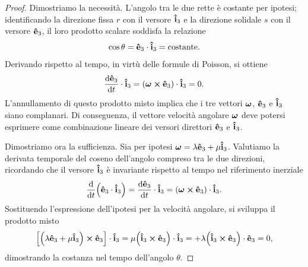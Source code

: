 \begin{proof}
    Dimostriamo la necessità. L'angolo tra le due rette è costante per ipotesi; identificando la direzione fissa $r$ con il versore $\vu{i}_3$ e la direzione solidale $s$ con il versore $\vu{e}_3$, il loro prodotto scalare soddisfa la relazione 
    \begin{equation*}
        \cos\theta = \vu{e}_3 \cdot \vu{i}_3 = \text{costante}.
    \end{equation*} 
    Derivando rispetto al tempo, in virtù delle formule di Poisson, si ottiene
    \begin{equation*}
        \dv{\vu{e}_3}{t} \cdot \vu{i}_3 = (\vb*{\omega} \cross \vu{e}_3) \cdot \vu{i}_3 = 0.
    \end{equation*}
    L'annullamento di questo prodotto misto implica che i tre vettori $\vb*{\omega}$, $\vu{e}_3$ e $\vu{i}_3$ siano complanari. Di conseguenza, il vettore velocità angolare $\vb*{\omega}$ deve potersi esprimere come combinazione lineare dei versori direttori $\vu{e}_3$ e $\vu{i}_3$.

    Dimostriamo ora la sufficienza. Sia per ipotesi $\vb*{\omega} = \lambda \vu{e}_3 + \mu \vu{i}_3$. Valutiamo la derivata temporale del coseno dell'angolo compreso tra le due direzioni, ricordando che il versore $\vu{i}_3$ è invariante rispetto al tempo nel riferimento inerziale
    \begin{equation*}
        \dv{t}\qty(\vu{e}_3 \cdot \vu{i}_3) = \dv{\vu{e}_3}{t} \cdot \vu{i}_3 = (\vb*{\omega} \cross \vu{e}_3) \cdot \vu{i}_3.
    \end{equation*}
    Sostituendo l'espressione dell'ipotesi per la velocità angolare, si sviluppa il prodotto misto
    \begin{equation*}
        \qty[\qty(\lambda \vu{e}_3 + \mu \vu{i}_3) \cross \vu{e}_3] \cdot \vu{i}_3 = \mu \qty(\vu{i}_3 \cross \vu{e}_3) \cdot \vu{i}_3 = + \lambda\qty(\vu{i}_3 \cross \vu{e}_3) \cdot \vu{e}_3 = 0,
    \end{equation*}
    dimostrando la costanza nel tempo dell'angolo $\theta$.
\end{proof}

